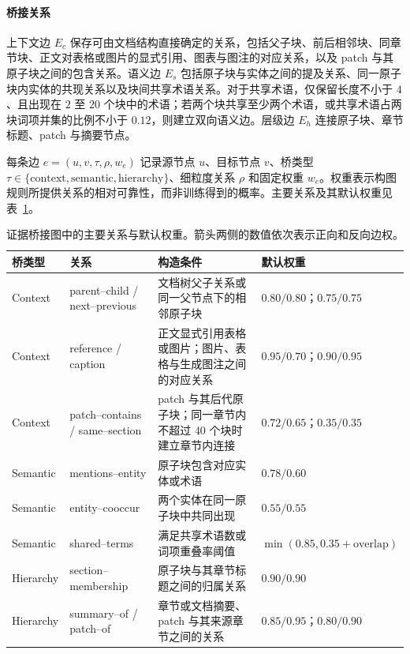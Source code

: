 \paragraph{桥接关系}
上下文边 $E_c$ 保存可由文档结构直接确定的关系，包括父子块、前后相邻块、同章节块、正文对表格或图片的显式引用、图表与图注的对应关系，以及 patch 与其原子块之间的包含关系。语义边 $E_s$ 包括原子块与实体之间的提及关系、同一原子块内实体的共现关系以及块间共享术语关系。对于共享术语，仅保留长度不小于 $4$、且出现在 $2$ 至 $20$ 个块中的术语；若两个块共享至少两个术语，或共享术语占两块词项并集的比例不小于 $0.12$，则建立双向语义边。层级边 $E_h$ 连接原子块、章节标题、patch 与摘要节点。

每条边 $e=(u,v,\tau,\rho,w_e)$ 记录源节点 $u$、目标节点 $v$、桥类型 $\tau\in\{\mathrm{context},\mathrm{semantic},\mathrm{hierarchy}\}$、细粒度关系 $\rho$ 和固定权重 $w_e$。权重表示构图规则所提供关系的相对可靠性，而非训练得到的概率。主要关系及其默认权重见表~\ref{tab:bridge_rules}。

\begin{table}[t]
\centering
\caption{证据桥接图中的主要关系与默认权重。箭头两侧的数值依次表示正向和反向边权。}
\label{tab:bridge_rules}
\small
\setlength{\tabcolsep}{4pt}
\begin{tabular}{p{1.5cm}p{3.6cm}p{7.5cm}p{1.8cm}}
\hline
\textbf{桥类型} & \textbf{关系} & \textbf{构造条件} & \textbf{默认权重} \\
\hline
Context
& parent--child / next--previous
& 文档树父子关系或同一父节点下的相邻原子块
& $0.80/0.80$；$0.75/0.75$ \\
Context
& reference / caption
& 正文显式引用表格或图片；图片、表格与生成图注之间的对应关系
& $0.95/0.70$；$0.90/0.95$ \\
Context
& patch--contains / same--section
& patch 与其后代原子块；同一章节内不超过 $40$ 个块时建立章节内连接
& $0.72/0.65$；$0.35/0.35$ \\
Semantic
& mentions--entity
& 原子块包含对应实体或术语
& $0.78/0.60$ \\
Semantic
& entity--cooccur
& 两个实体在同一原子块中共同出现
& $0.55/0.55$ \\
Semantic
& shared--terms
& 满足共享术语数或词项重叠率阈值
& $\min(0.85,0.35+\mathrm{overlap})$ \\
Hierarchy
& section--membership
& 原子块与其章节标题之间的归属关系
& $0.90/0.90$ \\
Hierarchy
& summary--of / patch--of
& 章节或文档摘要、patch 与其来源章节之间的关系
& $0.85/0.95$；$0.80/0.90$ \\
\hline
\end{tabular}
\end{table}

